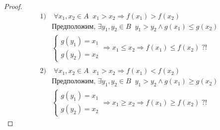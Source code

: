 \begin{proof}
    \begin{align*}
        1) & \; \forall x_1, x_2 \in A \;\; x_1 > x_2 \Rightarrow f(x_1) > f(x_2)  \\
        &\text{Предположим, } \exists y_1, y_2 \in B \;\; y_1 > y_2 \land g(x_1) \le g(x_2) \\
        &\left\{\begin{array}{l}
            g(y_1) = x_1 \\
            g(y_2) = x_2
        \end{array}\right. \Rightarrow
        x_1 \le x_2 \Rightarrow f(x_1) \le f(x_2) \; ?! \\ \\
        2) & \; \forall x_1, x_2 \in A \;\; x_1 > x_2 \Rightarrow f(x_1) < f(x_2)  \\
        &\text{Предположим, } \exists y_1, y_2 \in B \;\; y_1 > y_2 \land g(x_1) \ge g(x_2) \\
        &\left\{\begin{array}{l}
            g(y_1) = x_1 \\
            g(y_2) = x_2
        \end{array}\right. \Rightarrow
        x_1 \ge x_2 \Rightarrow f(x_1) \ge f(x_2) \; ?!
    \end{align*}
\end{proof}

